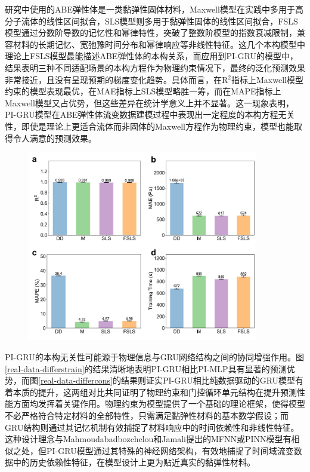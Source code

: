 研究中使用的ABE弹性体是一类黏弹性固体材料，Maxwell模型在实践中多用于高分子流体的线性区间拟合，SLS模型则多用于黏弹性固体的线性区间拟合，FSLS模型通过分数阶导数的记忆性和幂律特性，突破了整数阶模型的指数衰减限制，兼容材料的长期记忆、宽弛豫时间分布和幂律响应等非线性特征\cite{ricarteTutorialReviewLinear2024,ewoldtDesigningComplexFluids2022}。这几个本构模型中理论上FSLS模型最能描述ABE弹性体的本构关系，而应用到PI-GRU的模型中，结果表明三种不同适配场景的本构方程作为物理约束情况下，最终的泛化预测效果非常接近，且没有呈现预期的梯度变化趋势。具体而言，在R$^2$指标上Maxwell模型约束的模型表现最优，在MAE指标上SLS模型略胜一筹，而在MAPE指标上Maxwell模型又占优势，但这些差异在统计学意义上并不显著。这一现象表明，PI-GRU模型在ABE弹性体流变数据建模过程中表现出一定程度的本构方程无关性，即使是理论上更适合流体而非固体的Maxwell方程作为物理约束，模型也能取得令人满意的预测效果。
\begin{figure}
  \centering
  \includegraphics[width=0.9\textwidth]{Fig/real-data-differcons-metrics.pdf}
\end{figure}
PI-GRU的本构无关性可能源于物理信息与GRU网络结构之间的协同增强作用。图\ref{real-data-differstrain}的结果清晰地表明PI-GRU相比PI-MLP具有显著的预测优势，而图\ref{real-data-differcons}的结果则证实PI-GRU相比纯数据驱动的GRU模型有着本质的提升，这两组对比共同证明了物理约束和门控循环单元结构在提升预测性能方面均发挥着关键作用。物理约束为模型提供了一个基础的理论框架，使得模型不必严格符合特定材料的全部特性，只需满足黏弹性材料的基本数学假设；而GRU结构则通过其记忆机制有效捕捉了材料响应中的时间依赖性和非线性特征。这种设计理念与Mahmoudabadbozchelou和Jamali提出的MFNN或PINN模型有相似之处\cite{mahmoudabadbozchelouDatadrivenPhysicsinformedConstitutive2021}，但PI-GRU模型通过其特殊的神经网络架构，有效地捕捉了时间域流变数据中的历史依赖性特征，在模型设计上更为贴近真实的黏弹性材料。


